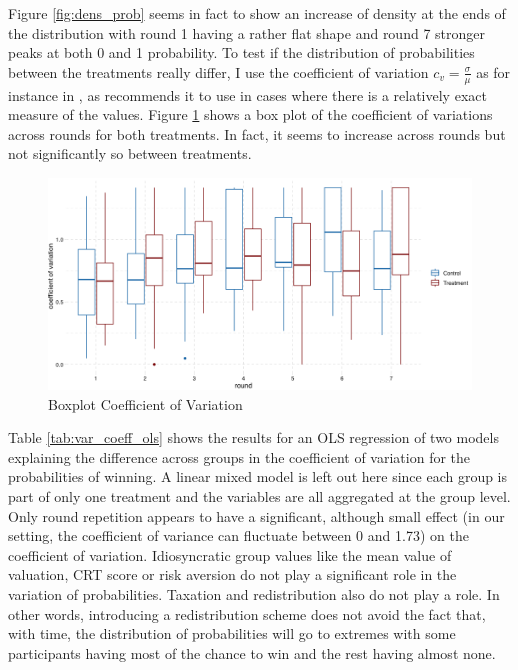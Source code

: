Figure \ref{fig:dens_prob} seems in fact to show an increase of density at the ends of the distribution with round 1 having a rather flat shape and round 7 stronger peaks at both 0 and 1 probability. To test if the distribution of probabilities between the treatments really differ, I use the coefficient of variation $c_v=\frac{\sigma}{\mu}$ as for instance in \cite{rassenti2000}, as \cite{bendel1989} recommends it to use in cases where there is a relatively exact measure of the values. Figure \ref{fig:var_coeff_boxplot} shows a box plot of the coefficient of variations across rounds for both treatments. In fact, it seems to increase across rounds but not significantly so between treatments.\\

\begin{figure}[H]
    \centering
    \includegraphics[width = \textwidth]{graphs/var_coeff_prob_boxplot.png}
    \caption{Boxplot Coefficient of Variation}
    \label{fig:var_coeff_boxplot}
\end{figure}

Table \ref{tab:var_coeff_ols} shows the results for an OLS regression of two models explaining the difference across groups in the coefficient of variation for the probabilities of winning. A linear mixed model is left out here since each group is part of only one treatment and the variables are all aggregated at the group level. Only round repetition appears to have a significant, although small effect (in our setting, the coefficient of variance can fluctuate between 0 and 1.73) on the coefficient of variation. Idiosyncratic group values like the mean value of valuation, CRT score or risk aversion do not play a significant role in the variation of probabilities. Taxation and redistribution also do not play a role. In other words, introducing a redistribution scheme does not avoid the fact that, with time, the distribution of probabilities will go to extremes with some participants having most of the chance to win and the rest having almost none.\\


